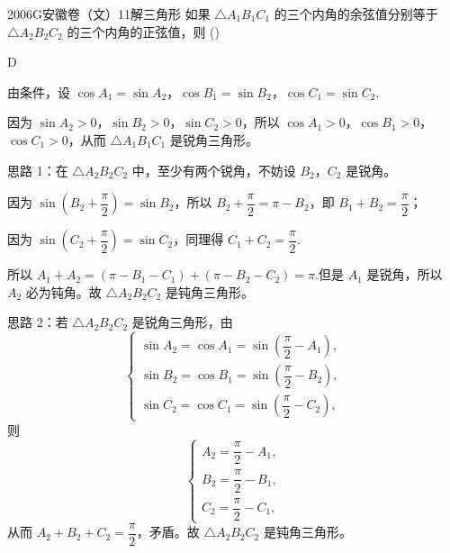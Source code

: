 
\begin{problem}{2006}{G}{安徽卷（文）}{11}{解三角形}
如果 $\triangle A_1B_1C_1$ 的三个内角的余弦值分别等于 $\triangle A_2B_2C_2$ 的三个内角的正弦值，则 (\hspace{1cm})
\begin{choices}
\end{choices}
\end{problem}

\begin{answer}
D
\end{answer}

\begin{solutions}
由条件，设 $\cos A_1=\sin A_2$，$\cos B_1=\sin B_2$，$\cos C_1=\sin C_2$.

因为 $\sin A_2>0$，$\sin B_2>0$，$\sin C_2>0$，所以 $\cos A_1>0$，$\cos B_1>0$，$\cos C_1>0$，从而 $\triangle A_1B_1C_1$ 是锐角三角形。

思路 1：在 $\triangle A_2B_2C_2$ 中，至少有两个锐角，不妨设 $B_2$，$C_2$ 是锐角。

因为 $\sin\left(B_2+\dfrac{\pi}{2}\right)=\sin B_2$，所以 $B_2+\dfrac{\pi}{2}=\pi-B_2$，即 $B_1+B_2=\dfrac{\pi}{2}$；

因为 $\sin\left(C_2+\dfrac{\pi}{2}\right)=\sin C_2$，同理得 $C_1+C_2=\dfrac{\pi}{2}$.

所以 $A_1+A_2=(\pi-B_1-C_1)+(\pi-B_2-C_2)=\pi$.但是 $A_1$ 是锐角，所以 $A_2$ 必为钝角。故 $\triangle A_2B_2C_2$ 是钝角三角形。

思路 2：若 $\triangle A_2B_2C_2$ 是锐角三角形，由
$$
\begin{cases}
\sin A_2=\cos A_1=\sin\left(\dfrac{\pi}{2}-A_1\right),\\
\sin B_2=\cos B_1=\sin\left(\dfrac{\pi}{2}-B_2\right),\\
\sin C_2=\cos C_1=\sin\left(\dfrac{\pi}{2}-C_2\right),
\end{cases}
$$
则
$$
\begin{cases}
A_2=\dfrac{\pi}{2}-A_1,\\
B_2=\dfrac{\pi}{2}-B_1,\\
C_2=\dfrac{\pi}{2}-C_1,
\end{cases}
$$
从而 $A_2+B_2+C_2=\dfrac{\pi}{2}$，矛盾。故 $\triangle A_2B_2C_2$ 是钝角三角形。
\end{solutions}